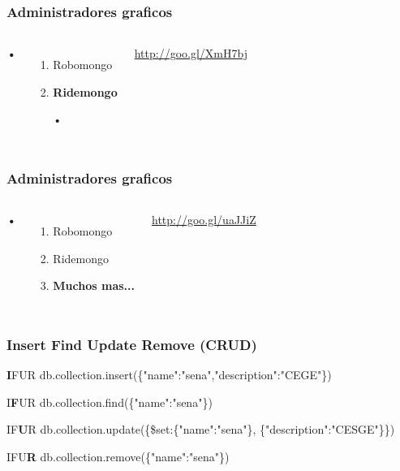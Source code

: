 \documentclass{beamer}
\begin{document}
\begin{frame}
\frametitle{Administradores graficos}
\begin{columns}[c] %

\textbf{•}
\begin{enumerate}
\item Robomongo
\item \textbf{Ridemongo}
\item[•]
\end{enumerate}

{\color{blue}\url{http://goo.gl/XmH7bj}}
\end{columns}
\end{frame}

\begin{frame}
\frametitle{Administradores graficos}
\begin{columns}[c] %

\textbf{•}
\begin{enumerate}
\item Robomongo
\item Ridemongo
\item \textbf{Muchos mas...}
\end{enumerate}

{\color{blue}\url{http://goo.gl/uaJJiZ}}
\end{columns}

\end{frame}

\begin{frame}
\frametitle{Insert Find Update Remove (CRUD)}
\begin{block}{\textbf{I}FUR}
db.collection.insert(\{"name":"sena","description":"CEGE"\})
\end{block}
\begin{block}{I\textbf{F}UR}
db.collection.find(\{"name":"sena"\})
\end{block}
\begin{block}{IF\textbf{U}R}
db.collection.update(\{\$set:\{"name":"sena"\},
\{"description":"CESGE"\}\})
\end{block}
\begin{block}{IFU\textbf{R}}
db.collection.remove(\{"name":"sena"\})
\end{block}
\end{frame}
\end{document}
